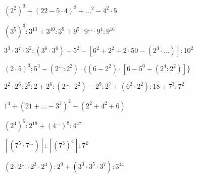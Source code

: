 \begin{esercizio} %
\((2^2)^3+(22-5\cdot4)^2+{\dots}^2-4^2\cdot5\) 
\end{esercizio}
\begin{esercizio} %
\((3^5)^3:3^{13}+3^{10}:3^9+9^5\cdot9^{\dots}\cdot9^4:9^{16}\) 
\end{esercizio}
\begin{esercizio} %
\(3^3\cdot3^7\cdot3^2:(3^6\cdot3^6)+5^2-[6^2+2^2+2\cdot50-(2^3\cdot{\dots})]:
10^2\) 
\end{esercizio}
\begin{esercizio} %
\((2\cdot5)^3:5^3-(2^{\dots}:2^2)\cdot\{(6-2^2)\cdot[6-5^0-(2^4:2^2)]\}\)
\end{esercizio}
\begin{esercizio} %
\(2^2\cdot2^6:2^5:2+2^6:(2^{\dots}\cdot2^2)-2^9:2^7+(6^2\cdot2^2):18+7^3:7^2\)
\end{esercizio}
\begin{esercizio} %
\(1^4+(21+{\dots}-3^3)^2-(2^2+4^2+6)\) 
\end{esercizio}
\begin{esercizio} %
\((2^4)^5:2^{19}+(4^{\dots})^8:4^{47}\) 
\end{esercizio}
\begin{esercizio} %
\([(7^5\cdot7^{\dots})]:[(7^3)^4]:7^2\) 
\end{esercizio}
\begin{esercizio} %
\((2\cdot2^{\dots}\cdot2^3\cdot2^4):2^9+(3^3\cdot3^5\cdot3^7):3^{14}\) 
\end{esercizio}
